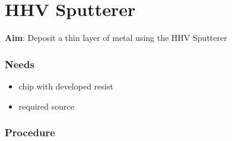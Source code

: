 \documentclass[12pt,a4paper]{report}
\begin{document}
\section{HHV Sputterer}

\textbf{Aim}:
Deposit a thin layer of metal using the HHV Sputterer

\subsubsection{Needs}
\begin{itemize}[noitemsep]
\item chip with developed resist
\item required source
\end{itemize}

\subsubsection{Procedure}
\end{document}
